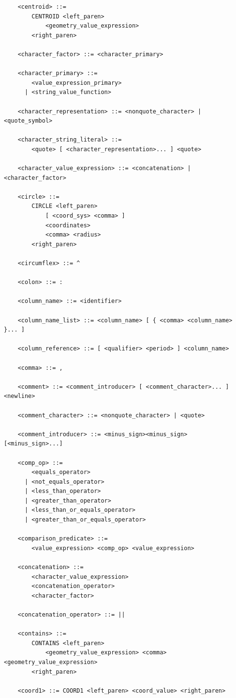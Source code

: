 \documentclass[11pt,a4paper]{ivoa}
\begin{document}
\begin{verbatim}
    <centroid> ::=
        CENTROID <left_paren>
            <geometry_value_expression>
        <right_paren>

    <character_factor> ::= <character_primary>

    <character_primary> ::=
        <value_expression_primary>
      | <string_value_function>

    <character_representation> ::= <nonquote_character> | <quote_symbol>

    <character_string_literal> ::=
        <quote> [ <character_representation>... ] <quote>

    <character_value_expression> ::= <concatenation> | <character_factor>

    <circle> ::=
        CIRCLE <left_paren>
            [ <coord_sys> <comma> ]
            <coordinates>
            <comma> <radius>
        <right_paren>

    <circumflex> ::= ^

    <colon> ::= :

    <column_name> ::= <identifier>

    <column_name_list> ::= <column_name> [ { <comma> <column_name> }... ]

    <column_reference> ::= [ <qualifier> <period> ] <column_name>

    <comma> ::= ,

    <comment> ::= <comment_introducer> [ <comment_character>... ] <newline>

    <comment_character> ::= <nonquote_character> | <quote>

    <comment_introducer> ::= <minus_sign><minus_sign> [<minus_sign>...]

    <comp_op> ::=
        <equals_operator>
      | <not_equals_operator>
      | <less_than_operator>
      | <greater_than_operator>
      | <less_than_or_equals_operator>
      | <greater_than_or_equals_operator>

    <comparison_predicate> ::=
        <value_expression> <comp_op> <value_expression>

    <concatenation> ::=
        <character_value_expression>
        <concatenation_operator>
        <character_factor>

    <concatenation_operator> ::= ||

    <contains> ::=
        CONTAINS <left_paren>
            <geometry_value_expression> <comma> <geometry_value_expression>
        <right_paren>

    <coord1> ::= COORD1 <left_paren> <coord_value> <right_paren>


\end{verbatim}
\end{document}
